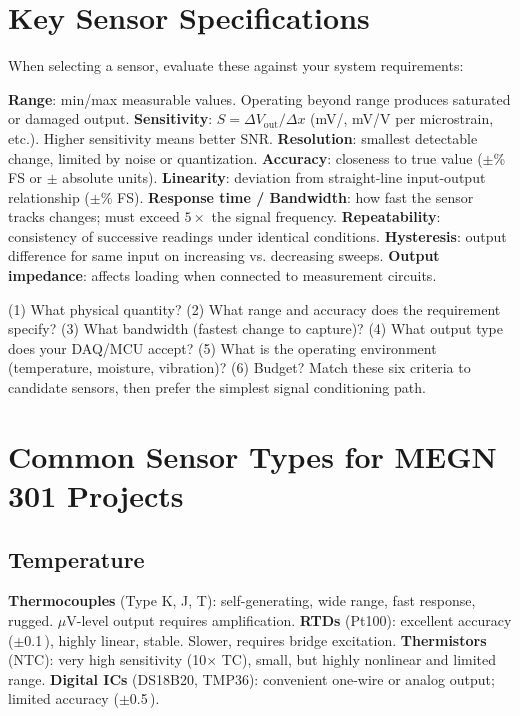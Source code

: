 \section{Key Sensor Specifications}
When selecting a sensor, evaluate these against your system requirements:

\textbf{Range}: min/max measurable values. Operating beyond range produces saturated or damaged output. \textbf{Sensitivity}: $S = \Delta V_{\text{out}}/\Delta x$ (mV/\degC{}, mV/V per microstrain, etc.). Higher sensitivity means better SNR. \textbf{Resolution}: smallest detectable change, limited by noise or quantization. \textbf{Accuracy}: closeness to true value ($\pm$\% FS or $\pm$ absolute units). \textbf{Linearity}: deviation from straight-line input-output relationship ($\pm$\% FS). \textbf{Response time / Bandwidth}: how fast the sensor tracks changes; must exceed $5\times$ the signal frequency. \textbf{Repeatability}: consistency of successive readings under identical conditions. \textbf{Hysteresis}: output difference for same input on increasing vs. decreasing sweeps. \textbf{Output impedance}: affects loading when connected to measurement circuits.

\begin{keyconceptbox}
(1) What physical quantity? (2) What range and accuracy does the requirement specify? (3) What bandwidth (fastest change to capture)? (4) What output type does your DAQ/MCU accept? (5) What is the operating environment (temperature, moisture, vibration)? (6) Budget? Match these six criteria to candidate sensors, then prefer the simplest signal conditioning path.
\end{keyconceptbox}

\section{Common Sensor Types for MEGN 301 Projects}

\subsection{Temperature}
\textbf{Thermocouples} (Type K, J, T): self-generating, wide range, fast response, rugged. $\mu$V-level output requires amplification. \textbf{RTDs} (Pt100): excellent accuracy ($\pm$0.1\,\degC{}), highly linear, stable. Slower, requires bridge excitation. \textbf{Thermistors} (NTC): very high sensitivity (10$\times$ TC), small, but highly nonlinear and limited range. \textbf{Digital ICs} (DS18B20, TMP36): convenient one-wire or analog output; limited accuracy ($\pm$0.5\,\degC{}).

